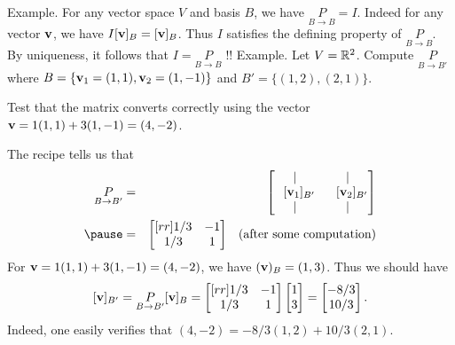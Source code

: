 \begin{frame}
\alert{Example}. For any vector space $V$ and basis $B$, we have $\underset{B\rightarrow B}{P}=I$. 
\bpause
Indeed for any vector ${\mathbf v}$, we have $I[{\mathbf v}]_B=[{\mathbf v}]_B$. Thus $I$ satisfies the defining property of $\underset{B\rightarrow B}{P}$. By uniqueness, it follows that $I=\underset{B\rightarrow B}{P}$ !!
\bpause
\alert{Example}. Let $V={\mathbb R}^2$. Compute $\underset{B\rightarrow B'}{P}$ where $B=\{{\mathbf v}_1=(1,1),{\mathbf v}_2=(1,-1)\}$ and $B'=\{(1,2),(2,1)\}$. 

Test that the matrix converts correctly using the vector ${\mathbf v}=1(1,1)+3(1,-1)=(4,-2)$. 
\begin{bsolution}
The recipe tells us that 
\begin{eqnarray*}
\underset{B\rightarrow B'}{P}&=&\begin{bmatrix}
\vert &\vert \\
\hspace{7pt}[\boldv_1]_{B'} &\hspace{7pt}[\boldv_2]_{B'}\\
\vert &\vert 
\end{bmatrix}\\
\pause&=&\begin{bmatrix}[rr]1/3&-1\\
1/3&1
\end{bmatrix} \hspace{8pt}\text{(after some computation)}
\end{eqnarray*}
\pause For ${\mathbf v}=1(1,1)+3(1,-1)=(4,-2)$, we have $({\mathbf v})_B=(1,3)$. Thus we should have 
\[
[{\mathbf v}]_{B'}=\underset{B\rightarrow B'}{P}[{\mathbf v}]_B=\begin{bmatrix}[rr]1/3&-1\\
1/3&1
\end{bmatrix}\begin{bmatrix}
1\\ 3
\end{bmatrix}=\begin{bmatrix}
-8/3\\
10/3 
\end{bmatrix}.
\]
\pause Indeed, one easily verifies that $(4,-2)=-8/3(1,2)+10/3(2,1)$. 
\end{bsolution}

\end{frame}
